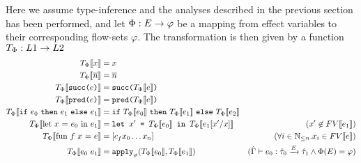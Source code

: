Here we assume type-inference and the analyses described in the previous section has
been performed, and let $\Phi : E \rightarrow \varphi$ be a mapping from
effect variables to their corresponding flow-sets $\varphi$.
The transformation is then given by a function $T_\Phi : L1 \rightarrow L2$
\begin{align*}
  T_{\Phi}\LB\text{$x$}\RB &= x\\
  T_{\Phi}\LB\text{$\overline n$}\RB &= \overline n\\
  T_{\Phi}\LB\text{\tt succ($e$)}\RB &= \text{\tt succ($T_{\Phi}\LB{e}\RB$)}\\
  T_{\Phi}\LB\text{\tt pred($e$)}\RB &= \text{\tt pred($T_{\Phi}\LB{e}\RB$)}\\
  T_{\Phi}\LB\IF{e_0}{e_1}{e_1}\RB &= \IF{T_{\Phi}\LB{e_0}\RB}{T_{\Phi}\LB{e_1}\RB}{T_{\Phi}\LB{e_2}\RB}\\
  T_{\Phi}\LB\text{let $x$ = $e_0$ in $e_1$}\RB &=
  \text{\tt let $x'$ = $T_{\Phi}\LB{e_0}\RB$ in $T_{\Phi}\LB{e_1[x'/x]}\RB$} &\text{\hfill}(x' \not\in FV\LB{e_1}\RB)\\
  T_{\Phi}\LB\text{fun $f$ $x$ = $e$}\RB &=
  [c_f x_0 \dots x_n] &(\forall i \in \N_{\leq n}. x_i \in FV\LB{e}\RB)\\
  T_{\Phi}\LB{e_0\ e_1}\RB &= \text{\tt apply}_{\varphi} (T_{\Phi}\LB{e_0}\RB, T_{\Phi}\LB{e_1}\RB)
  & (\hat\Gamma\vdash e_0 : \hat\tau_0 \xrightarrow{E} \hat\tau_1 \land \Phi(E) = \varphi)
\end{align*}

